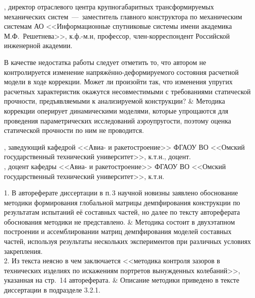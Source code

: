 \begin{frame}
	\beginSkip
	, директор отраслевого центра крупногабаритных трансформируемых механических систем~---~заместитель главного конструктора по механическим системам АО <<Информационные спутниковые системы имени академика М.Ф.~Решетнева>>, к.ф.-м.н, профессор, член-корреспондент Российской инженерной академии.
	\begin{comtblr}{18em}
		В качестве недостатка работы следует отметить то, что автором не контролируется изменение напряжённо-деформируемого состояния расчетной модели в ходе коррекции. Может ли произойти так, что изменения упругих расчетных характеристик окажутся несовместимыми с требованиями статической прочности, предъявляемыми к анализируемой конструкции?
		&
		Методика коррекции оперирует динамическими моделями, которые упрощаются для проведения параметрических исследований аэроупругости, поэтому оценка статической прочности по ним не проводится. 
	\end{comtblr}
\end{frame}

\begin{frame}
	\beginSkip
	, заведующий кафедрой <<Авиа- и ракетостроение>> ФГАОУ ВО <<Омский государственный технический университет>>, к.т.н., доцент. \\
	, доцент кафедры <<Авиа- и ракетостроение>> ФГАОУ ВО <<Омский государственный технический университет>>, к.т.н. \\
	\begin{comtblr}{}
		1. В автореферате диссертации в п.\,3 научной новизны заявлено обоснование методики формирования глобальной матрицы демпфирования конструкции по результатам испытаний её составных частей, но далее по тексту автореферата обоснования методики не представлено.
		&
		Методика состоит в двухэтапном построении и ассемблировании матриц демпфирования моделей составных частей, используя результаты нескольких экспериментов при различных условиях закрепления. \\
		2. Из текста неясно в чем заключается <<методика контроля зазоров в технических изделиях по искажениям портретов вынужденных колебаний>>, указанная на стр.~14 автореферата.
		&
		Описание методики приведено в тексте диссертации в подразделе 3.2.1. 
	\end{comtblr}
\end{frame}

